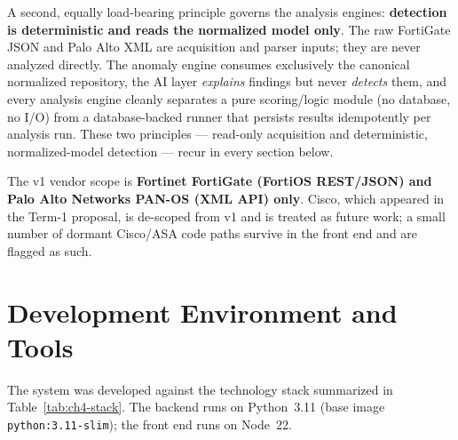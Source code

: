 \documentclass[12pt,a4paper]{report}
\renewcommand{\_}{\textunderscore\allowbreak}
\begin{document}
A second, equally load-bearing principle governs the analysis engines: \textbf{detection is deterministic and reads the normalized model only}. The raw FortiGate JSON and Palo Alto XML are acquisition and parser inputs; they are never analyzed directly. The anomaly engine consumes exclusively the canonical normalized repository, the AI layer \emph{explains} findings but never \emph{detects} them, and every analysis engine cleanly separates a pure scoring/logic module (no database, no I/O) from a database-backed runner that persists results idempotently per analysis run. These two principles --- read-only acquisition and deterministic, normalized-model detection --- recur in every section below.

The v1 vendor scope is \textbf{Fortinet FortiGate (FortiOS REST/JSON) and Palo Alto Networks PAN-OS (XML API) only}. Cisco, which appeared in the Term-1 proposal, is de-scoped from v1 and is treated as future work; a small number of dormant Cisco/ASA code paths survive in the front end and are flagged as such.

\section{Development Environment and Tools}
\label{sec:ch4-devenv}

The system was developed against the technology stack summarized in Table~\ref{tab:ch4-stack}. The backend runs on Python~3.11 (base image \texttt{python:3.11-slim}); the front end runs on Node~22.
\end{document}
